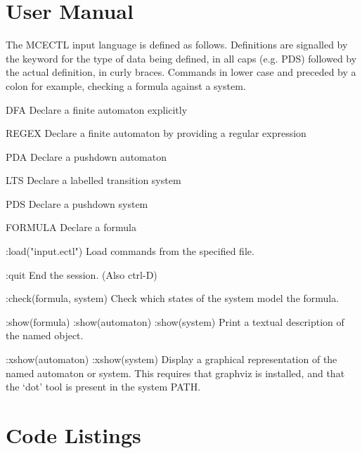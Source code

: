 \documentclass[11pt]{article}
\begin{document}
\appendix
\section{User Manual}

The MCECTL input language is defined as follows.
Definitions are signalled by the keyword for the type of data being defined, in all caps (e.g. PDS) followed by the actual definition, in curly braces.
Commands in lower case and preceded by a colon 
for example, checking a formula against a system.

DFA
Declare a finite automaton explicitly

REGEX
Declare a finite automaton by providing a regular expression

PDA
Declare a pushdown automaton

LTS
Declare a labelled transition system

PDS
Declare a pushdown system 

FORMULA
Declare a formula

:load("input.ectl")
Load commands from the specified file.

:quit
End the session. (Also ctrl-D)

:check(formula, system)
Check which states of the system model the formula.

:show(formula)
:show(automaton)
:show(system)
Print a textual description of the named object.

:xshow(automaton)
:xshow(system)
Display a graphical representation of the named automaton or system.
This requires that graphviz is installed, and that the `dot' tool is present in
the system PATH.



\section{Code Listings}
\end{document}
